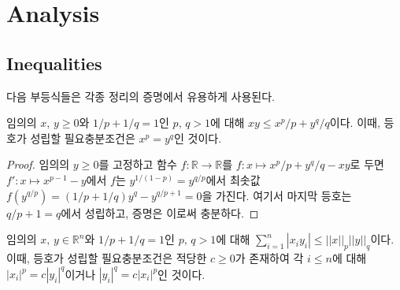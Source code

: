\section{Analysis}

\subsection{Inequalities}

다음 부등식들은 각종 정리의 증명에서 유용하게 사용된다.

\begin{theorem}
    임의의 $x,\,y\geq0$와 $1/p+1/q=1$인 $p,\,q>1$에 대해 $xy\leq x^p/p+y^q/q$이다. 이때, 등호가 성립할 필요충분조건은 $x^p=y^q$인 것이다.
\end{theorem}

\begin{proof}
    임의의 $y\geq0$를 고정하고 함수 $f:\mathbb{R}\to\mathbb{R}$를 $f:x\mapsto x^p/p+y^q/q-xy$로 두면 $f':x\mapsto x^{p-1}-y$에서 $f$는 $y^{1/(1-p)}=y^{q/p}$에서 최솟값 $f(y^{q/p})=(1/p+1/q)y^q-y^{q/p+1}=0$을 가진다. 여기서 마지막 등호는 $q/p+1=q$에서 성립하고, 증명은 이로써 충분하다.
\end{proof}

\begin{theorem}
    임의의 $x,\,y\in\mathbb{R}^n$와 $1/p+1/q=1$인 $p,\,q>1$에 대해 $\sum_{i=1}^n|x_iy_i|\leq||x||_p||y||_q$이다. 이때, 등호가 성립할 필요충분조건은 적당한 $c\geq0$가 존재하여 각 $i\leq n$에 대해 $|x_i|^p=c|y_i|^q$이거나 $|y_i|^q=c|x_i|^p$인 것이다.
\end{theorem}

